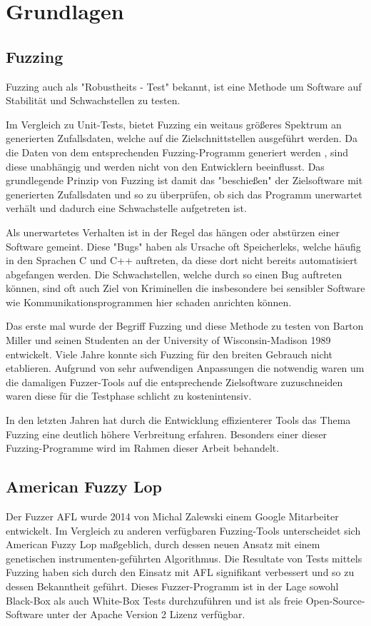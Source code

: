 \documentclass[12pt,a4paper]{scrreprt}
\begin{document}
\newpage
\chapter{Grundlagen} 

\section{Fuzzing}
Fuzzing auch als "Robustheits - Test" bekannt, ist eine Methode um Software auf Stabilität und Schwachstellen zu testen. 

Im Vergleich zu Unit-Tests, bietet Fuzzing ein weitaus größeres Spektrum an generierten Zufallsdaten, welche auf die Zielschnittstellen ausgeführt werden. 
Da die Daten von dem entsprechenden Fuzzing-Programm generiert werden , sind diese unabhängig und werden nicht von den Entwicklern beeinflusst. Das grundlegende Prinzip von Fuzzing ist damit das "beschießen" der Zielsoftware mit generierten Zufallsdaten und so zu überprüfen, ob sich das Programm unerwartet verhält und dadurch eine Schwachstelle aufgetreten ist.

Als unerwartetes Verhalten ist in der Regel das hängen oder abstürzen einer Software gemeint. Diese "Bugs" haben als Ursache oft Speicherleks, welche häufig in den Sprachen C und C++ auftreten, da diese dort nicht bereits automatisiert abgefangen werden. Die Schwachstellen, welche durch so einen Bug auftreten können, sind oft auch Ziel von Kriminellen die insbesondere bei sensibler Software wie Kommunikationsprogrammen hier schaden anrichten können.

Das erste mal wurde der Begriff Fuzzing und diese Methode zu testen von Barton Miller und seinen Studenten an der University of Wisconsin-Madison 1989 entwickelt.
Viele Jahre konnte sich Fuzzing für den breiten Gebrauch nicht etablieren. Aufgrund von sehr aufwendigen Anpassungen die notwendig waren um die damaligen Fuzzer-Tools auf die entsprechende Zielsoftware zuzuschneiden waren diese für die Testphase schlicht zu kostenintensiv. 

In den letzten Jahren hat durch die Entwicklung effizienterer Tools das Thema Fuzzing eine deutlich höhere Verbreitung erfahren. Besonders einer dieser Fuzzing-Programme wird im Rahmen dieser Arbeit behandelt.   

\newpage

\section{American Fuzzy Lop}
Der Fuzzer AFL wurde 2014 von Michal Zalewski einem Google Mitarbeiter entwickelt. Im Vergleich zu anderen verfügbaren Fuzzing-Tools unterscheidet sich American Fuzzy Lop maßgeblich, durch dessen neuen Ansatz mit einem genetischen instrumenten-geführten Algorithmus. Die Resultate von Tests mittels Fuzzing haben sich durch den Einsatz mit AFL signifikant verbessert und so zu dessen Bekanntheit geführt. 
Dieses Fuzzer-Programm ist in der Lage sowohl Black-Box als auch White-Box Tests durchzuführen und ist als freie Open-Source-Software unter der Apache Version 2 Lizenz verfügbar. 
\end{document}

